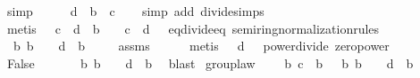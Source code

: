 \begin{isabellebody}
\ simp{\isacharplus}\isanewline
\ \ \isamarkupfalse%
\ \isamarkupfalse%
\ {\isachardoublequoteopen}{}{\isacharslash}d\ {\isacharequal}\ b{\isacharcircum}{}\ {\isacharslash}\ {\isacharparenleft}{}{\isacharslash}c{\isacharparenright}{\isachardoublequoteclose}\isanewline
\ \ \ \isamarkupfalse%
{\isacharparenleft}simp\ add{\isacharcolon}\ divide{\isacharunderscore}simps{\isacharparenright}\isanewline
\ \ \ \isamarkupfalse%
\ {\isacharparenleft}metis\ {\isacartoucheopen}{}\ {\isacharslash}\ {\isacharparenleft}c\ {\isacharasterisk}\ d{\isacharparenright}\ {\isacharequal}\ b\ {\isasymand}\ {}\ {\isacharslash}\ {\isacharparenleft}c\ {\isacharasterisk}\ d{\isacharparenright}\ {\isasymnoteq}\ {}{\isacartoucheclose}\ eq{\isacharunderscore}divide{\isacharunderscore}eq\ semiring{\isacharunderscore}normalization{\isacharunderscore}rules{\isacharparenleft}{}{}{\isacharparenright}{\isacharparenright}\isanewline
\ \ \isamarkupfalse%
\ \isamarkupfalse%
\ {\isachardoublequoteopen}{\isasymexists}\ b{\isachardot}\ b\ {\isasymnoteq}\ {}\ {\isasymand}\ {}{\isacharslash}d\ {\isacharequal}\ b{\isacharcircum}{}{\isachardoublequoteclose}\isanewline
\ \ \ \isamarkupfalse%
\ assms{\isacharparenleft}{}{\isacharparenright}\ \isanewline
\ \ \ \isamarkupfalse%
\ {\isacharparenleft}metis\ {\isacartoucheopen}{}\ {\isacharslash}\ d\ {\isasymnoteq}\ {}{\isacartoucheclose}\ power{\isacharunderscore}divide\ zero{\isacharunderscore}power{}{\isacharparenright}\isanewline
\ \ \isamarkupfalse%
\ \isamarkupfalse%
\ {\isachardoublequoteopen}False{\isachardoublequoteclose}\isanewline
\ \ \ \isamarkupfalse%
\ {\isacartoucheopen}{\isasymnot}\ {\isacharparenleft}{\isasymexists}\ b{\isachardot}\ b\ {\isasymnoteq}\ {}\ {\isasymand}\ {}{\isacharslash}d\ {\isacharequal}\ b{\isacharcircum}{}{\isacharparenright}{\isacartoucheclose}\ \isamarkupfalse%
\ blast\isanewline
{}\isamarkupfalse%
%
\endisatagproof
{\isafoldproof}%
%
\isadelimproof
\isanewline
%
\endisadelimproof
\isanewline
{}\isamarkupfalse%
\ group{\isacharunderscore}law{\isacharcolon}\isanewline
\ \ \ {\isachardoublequoteopen}{\isasymexists}\ b{\isachardot}\ {}{\isacharslash}c\ {\isacharequal}\ b{\isacharcircum}{}{\isachardoublequoteclose}\ {\isachardoublequoteopen}{\isasymnot}\ {\isacharparenleft}{\isasymexists}\ b{\isachardot}\ b\ {\isasymnoteq}\ {}\ {\isasymand}\ {}{\isacharslash}d\ {\isacharequal}\ b{\isacharcircum}{}{\isacharparenright}{\isachardoublequoteclose}\isanewline

\end{isabellebody}
